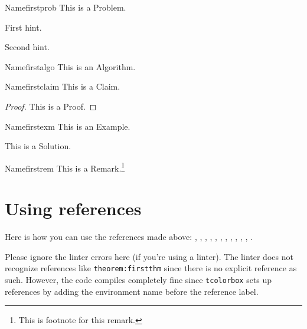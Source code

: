 \documentclass[12pt]{scrartcl}
\begin{document}
\begin{problem}{Name}{firstprob}
  This is a Problem.
\end{problem}
\begin{hints}
  \begin{hint}
    First hint.
  \end{hint}
  \begin{hint}
    Second hint.
  \end{hint}
\end{hints}

\begin{algorithm}{Name}{firstalgo}
  This is an Algorithm.
\end{algorithm}

\begin{claim}{Name}{firstclaim}
  This is a Claim.
\end{claim}

\begin{proof}
  This is a Proof.
\end{proof}

\begin{example}{Name}{firstexm}
  This is an Example.
\end{example}

\begin{soln}
  This is a Solution.
\end{soln}

\hrulebar

\begin{remark}{Name}{firstrem}
  This is a Remark.\footnote{This is footnote for this remark.}
\end{remark}

\section{Using references}

Here is how you can use the references made above:
,
,
,
,
,
,
,
,
,
,
,
.

Please ignore the linter errors here (if you're using a linter).
The linter does not recognize references like \texttt{theorem:firstthm}
since there is no explicit reference as such. However, the code
compiles completely fine since \texttt{tcolorbox} sets up
references by adding the environment name before the reference label.
\end{document}
